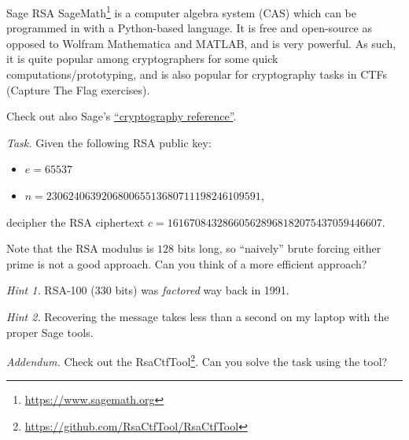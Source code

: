 \documentclass{practice}
\begin{document}
\begin{task}{Sage RSA}
  SageMath\footnote{\url{https://www.sagemath.org}} is a computer algebra system (CAS) which can be programmed in with a Python-based language.
  It is free and open-source as opposed to Wolfram Mathematica and MATLAB, and is very powerful.
  As such, it is quite popular among cryptographers for some quick computations/prototyping, and is also popular for cryptography tasks in CTFs (Capture The Flag exercises).

  Check out also Sage's \href{https://doc.sagemath.org/html/en/reference/cryptography/index.html}{\enquote{cryptography reference}}.

  \textit{Task.}
  Given the following RSA public key:
  \begin{itemize}
    \item $e = 65537$
    \item $n = 230624063920680065513680711198246109591$,
  \end{itemize}
  decipher the RSA ciphertext $c = 161670843286605628968182075437059446607$.

  Note that the RSA modulus is $128$ bits long, so \enquote{naively} brute forcing either prime is not a good approach.
  Can you think of a more efficient approach?
  
  \textit{Hint 1.}
  RSA-100 ($330$ bits) was \emph{factored} way back in 1991.

  \textit{Hint 2.}
  Recovering the message takes less than a second on my laptop with the proper Sage tools.

  \textit{Addendum.}
  Check out the RsaCtfTool\footnote{\url{https://github.com/RsaCtfTool/RsaCtfTool}}.
  Can you solve the task using the tool?
\end{task}
\end{document}
